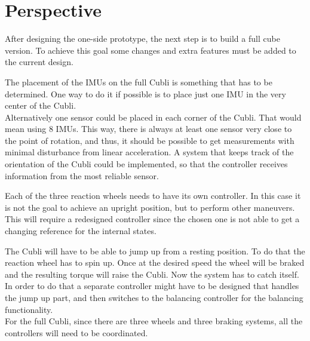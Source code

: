 \chapter{Perspective}
After designing the one-side prototype, the next step is to build a full cube version. To achieve this goal some changes and extra features must be added to the current design.

The placement of the IMUs on the full Cubli is something that has to be determined. One way to do it if possible is to place just one IMU in the very center of the Cubli.\\
Alternatively one sensor could be placed in each corner of the Cubli. That would mean using 8 IMUs. This way, there is always at least one sensor very close to the point of rotation, and thus, it should be possible to get measurements with minimal disturbance from linear acceleration. A system that keeps track of the orientation of the Cubli could be implemented, so that the controller receives information from the most reliable sensor.

Each of the three reaction wheels needs to have its own controller. In this case it is not the goal to achieve an upright position, but to perform other maneuvers. This will require a redesigned controller since the chosen one is not able to get a changing reference for the internal states.

The Cubli will have to be able to jump up from a resting position. To do that the reaction wheel has to spin up. Once at the desired speed the wheel will be braked and the resulting torque will raise the Cubli. Now the system has to catch itself. In order to do that a separate controller might have to be designed that handles the jump up part, and then switches to the balancing controller for the balancing functionality.\\
For the full Cubli, since there are three wheels and three braking systems, all the controllers will need to be coordinated.


